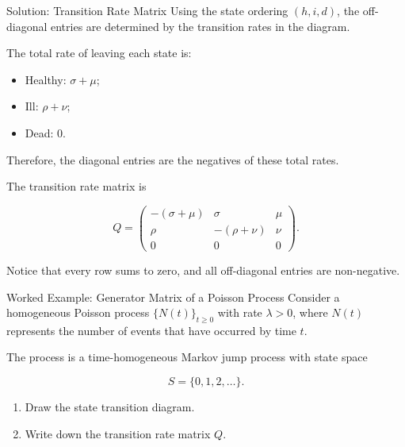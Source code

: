 \documentclass[
  ignorenonframetext,
  aspectratio=169,
]{beamer}
\providecommand{\tightlist}{%
  \setlength{\itemsep}{0pt}\setlength{\parskip}{0pt}}
\begin{document}
\begin{frame}{Solution: Transition Rate Matrix}
\protect{}\label{solution-transition-rate-matrix-1}
Using the state ordering \((h,i,d)\), the off-diagonal entries are
determined by the transition rates in the diagram.

The total rate of leaving each state is:

\begin{itemize}
\tightlist
\item
  Healthy: \(\sigma+\mu\);
\item
  Ill: \(\rho+\nu\);
\item
  Dead: \(0\).
\end{itemize}

Therefore, the diagonal entries are the negatives of these total rates.

The transition rate matrix is

\[
\boxed{
Q=
\begin{pmatrix}
-(\sigma+\mu) & \sigma & \mu\\
\rho & -(\rho+\nu) & \nu\\
0 & 0 & 0
\end{pmatrix}.
}
\]

Notice that every row sums to zero, and all off-diagonal entries are
non-negative.
\end{frame}

\begin{frame}{Worked Example: Generator Matrix of a Poisson Process}
\protect{}\label{worked-example-generator-matrix-of-a-poisson-process}
Consider a homogeneous Poisson process \(\{N(t)\}_{t\geq 0}\) with rate
\(\lambda>0\), where \(N(t)\) represents the number of events that have
occurred by time \(t\).

The process is a time-homogeneous Markov jump process with state space

\[
S=\{0,1,2,\ldots\}.
\]

\begin{enumerate}
\tightlist
\item
  Draw the state transition diagram.
\item
  Write down the transition rate matrix \(Q\).
\end{enumerate}
\end{frame}
\end{document}
